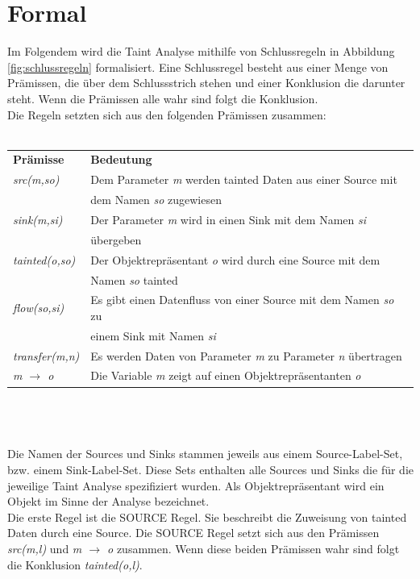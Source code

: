 \documentclass[runningheads]{llncs}
\begin{document}
\section{Formal}
Im Folgendem wird die Taint Analyse mithilfe von Schlussregeln in Abbildung \ref{fig:schlussregeln} formalisiert. Eine Schlussregel besteht aus einer Menge von Prämissen, die über dem Schlussstrich stehen und einer Konklusion die darunter steht. Wenn die Prämissen alle wahr sind folgt die Konklusion. \\
Die Regeln setzten sich aus den folgenden Prämissen zusammen:\\\\
\begin{tabular}{ll}
	\textbf{Prämisse}			& \textbf{Bedeutung}\\
	\emph{src(m,so)}			& Dem Parameter \emph{m} werden tainted Daten aus einer Source mit \\ 
								& dem Namen \emph{so} zugewiesen\\
	\emph{sink(m,si)} 			& Der Parameter \emph{m} wird in einen Sink mit dem Namen \emph{si} \\
								& übergeben\\
	\emph{tainted(o,so)} 		& Der Objektrepräsentant \emph{o} wird durch eine Source mit dem \\
								& Namen \emph{so} tainted\\
	\emph{flow(so,si)} 			& Es gibt einen Datenfluss von einer Source mit dem Namen \emph{so} zu\\
								& einem Sink mit Namen \emph{si}\\
	\emph{transfer(m,n)} 		& Es werden Daten von Parameter \emph{m} zu Parameter \emph{n} übertragen\\
	\emph{m $\rightarrow$ o} 	& Die Variable \emph{m} zeigt auf einen Objektrepräsentanten \emph{o}
\end{tabular}\\\\\\
Die Namen der Sources und Sinks stammen jeweils aus einem Source-Label-Set, bzw. einem Sink-Label-Set. Diese Sets enthalten alle Sources und Sinks die für die jeweilige Taint Analyse spezifiziert wurden. Als Objektrepräsentant wird ein Objekt im Sinne der Analyse bezeichnet.\\
Die erste Regel ist die SOURCE Regel. Sie beschreibt die Zuweisung von tainted Daten durch eine Source. Die SOURCE Regel setzt sich aus den Prämissen \emph{src(m,l)} und \emph{m $\rightarrow$ o} zusammen. Wenn diese beiden Prämissen wahr sind folgt die Konklusion \emph{tainted(o,l)}. \\
\end{document}
